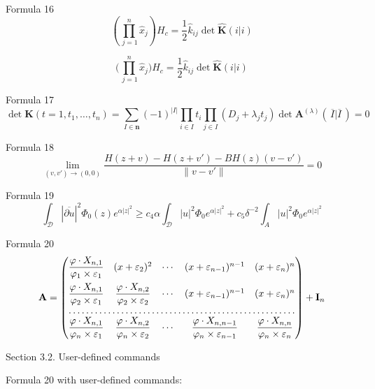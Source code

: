 \documentclass{article}
\begin{document}
Formula 16
\[
   \left( \prod^n_{\, j = 1} \hat x_{j} \right) H_{c} = 
    \frac{1}{2} \hat k_{ij} \det \hat{ \mathbf{K} }(i|i)
\]

\[
   \biggl( \prod^n_{\, j = 1} \hat x_{j} \biggr) H_{c} = 
    \frac{1}{2} \hat{k}_{ij} \det \widehat{ \mathbf{K} }(i|i) 
\]

Formula 17
\[
   \det \mathbf{K} (t = 1, t_{1}, \ldots, t_{n}) = 
    \sum_{I \in \mathbf{n} }(-1)^{|I|}
    \prod_{i \in I} t_{i} 
    \prod_{j \in I} (D_{j} + \lambda_{j} t_{j}) 
    \det \mathbf{A}^{(\lambda)} (\,\overline{I} | \overline{I}\,) = 0 
\]

Formula 18
\[
   \lim_{(v, v') \to (0, 0)} 
    \frac{H(z + v) - H(z + v') - BH(z)(v - v')}
         {\| v - v' \|} = 0 
\]

Formula 19
\[
   \int_{\mathcal{D}} | \overline{\partial u} |^{2} 
    \Phi_{0}(z) e^{\alpha |z|^2} \geq 
    c_{4} \alpha \int_{\mathcal{D}} |u|^{2} \Phi_{0} 
    e^{\alpha |z|^{2}} + c_{5} \delta^{-2} \int_{A} 
    |u|^{2} \Phi_{0} e^{\alpha |z|^{2}} 
\]

Formula 20
\[ 
   \mathbf{A} = 
   \begin{pmatrix}
      \dfrac{\varphi \cdot X_{n, 1}}
            {\varphi_{1} \times \varepsilon_{1}} 
      & (x + \varepsilon_{2})^{2} & \cdots
      & (x + \varepsilon_{n - 1})^{n - 1} 
      & (x + \varepsilon_{n})^{n}\\[10pt]
      \dfrac{\varphi \cdot X_{n, 1}}
            {\varphi_{2} \times \varepsilon_{1}} 
      & \dfrac{\varphi \cdot X_{n, 2}}
              {\varphi_{2} \times \varepsilon_{2}} 
      & \cdots & (x + \varepsilon_{n - 1})^{n - 1} 
      & (x + \varepsilon_{n})^{n}\\
      \hdotsfor{5}\\
      \dfrac{\varphi \cdot X_{n, 1}}
            {\varphi_{n} \times \varepsilon_{1}} 
      & \dfrac{\varphi \cdot X_{n, 2}}
              {\varphi_{n} \times \varepsilon_{2}} 
      & \cdots & \dfrac{\varphi \cdot X_{n, n - 1}}
                       {\varphi_{n} \times \varepsilon_{n - 1}} 
      & \dfrac{\varphi\cdot X_{n, n}}
              {\varphi_{n} \times \varepsilon_{n}}
   \end{pmatrix} 
    + \mathbf{I}_{n}
\]


Section 3.2. User-defined commands

Formula 20 with user-defined commands:

\newcommand{\quot}[2]{%
\dfrac{\varphi \cdot X_{n, #1}}%
{\varphi_{#2} \times \varepsilon_{#1}}}
\newcommand{\exn}[1]{(x+\varepsilon_{#1})^{#1}}
\end{document}
